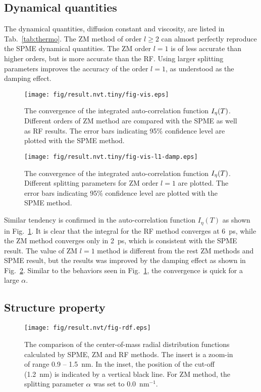 \documentclass[a4paper,preprint,unsortedaddress,onecolumn,fleqn]{revtex4}
\begin{document}
\subsection{Dynamical quantities}

The dynamical quantities, diffusion constant and viscosity, are listed in
Tab.~\ref{tab:thermo}. The ZM method of order $l\geq 2$ can almost perfectly
reproduce the SPME dynamical quantities. The ZM order $l=1$ is of less
accurate than higher orders, but is more accurate than the RF. Using larger
splitting parameters improves the accuracy of the order $l=1$, as understood
as the damping effect.

\begin{figure}[tbp]
\centering
\texttt{[image: fig/result.nvt.tiny/fig-vis.eps]}
\caption{The convergence of the integrated auto-correlation function $I_{%
\protect\eta }(T)$. Different orders of ZM method are compared with the SPME
as well as RF results. The error bars indicating 95\% confidence level are
plotted with the SPME method. }
\label{fig:conv-vis}
\end{figure}

\begin{figure}[tbp]
\centering
\texttt{[image: fig/result.nvt.tiny/fig-vis-l1-damp.eps]}
\caption{The convergence of the integrated auto-correlation function $I_{%
\protect\eta }(T)$. Different splitting parameters for ZM order $l=1$ are
plotted. The error bars indicating 95\% confidence level are plotted with
the SPME method. }
\label{fig:conv-vis-damp}
\end{figure}

Similar tendency is confirmed in the auto-correlation function $I_{\eta }(T)$
as shown in Fig.~\ref{fig:conv-vis}. It is clear that the integral for the
RF method converges at 6~ps, while the ZM method converges only in 2~ps,
which is consistent with the SPME result. The value of ZM $l=1$ method is
different from the rest ZM methods and SPME result, but the results was
improved by the damping effect as shown in Fig.~\ref{fig:conv-vis-damp}. 
Similar to the behaviors seen in Fig.~\ref{fig:conv-vis}, the
convergence is quick for a large $\alpha $.

\subsection{Structure property}

\begin{figure}[tbp]
\centering
\texttt{[image: fig/result.nvt/fig-rdf.eps]}
\caption{The comparison of the center-of-mass radial distribution functions
calculated by SPME, ZM and RF methods. The insert is a zoom-in of range 0.9
-- 1.5~nm. In the inset, the position of the cut-off (1.2~nm) is indicated
by a vertical black line. For ZM method, the splitting parameter $\protect%
\alpha $ was set to 0.0~$\text{nm}^{-1}$. }
\label{fig:rdf}
\end{figure}
\end{document}
